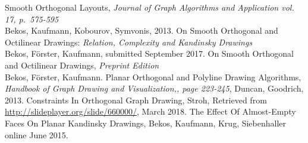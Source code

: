 \begin{thebibliography}{9}
	Smooth Orthogonal Layouts,
	\textit{Journal of Graph Algorithms and Application vol. 17, p.~575-595}\\
	Bekos, Kaufmann, Kobourov, Symvonis,
	2013.
	On Smooth Orthogonal and Octilinear Drawings:
	\textit{Relation, Complexity and Kandinsky Drawings}\\
	Bekos, Förster, Kaufmann,
	submitted September 2017.
	On Smooth Orthogonal and Octilinear Drawings, \textit{Preprint Edition}\\
	Bekos, Förster, Kaufmann.
	Planar Orthogonal and Polyline Drawing Algorithms,
	\textit{Handbook of Graph Drawing and Visualization,, page 223-245},
	Duncan, Goodrich,
	2013.
	Constraints In Orthogonal Graph Drawing, Stroh, Retrieved from \url{http://slideplayer.org/slide/660000/}, March 2018.
	The Effect Of Almost-Empty Faces On Planar Kandinsky Drawings, Bekos, Kaufmann, Krug, Siebenhaller\\
	online June 2015.
\end{thebibliography}